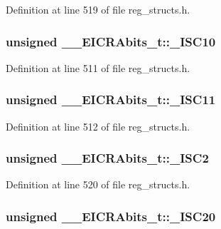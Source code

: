 Definition at line 519 of file reg\+\_\+structs.\+h.

\hypertarget{union_____e_i_c_r_abits__t_a7ede693280bdf47a326b0d9ea6622afd}{
\subsubsection[{\+\_\+\+I\+S\+C10}]{\setlength{\rightskip}{0pt plus 5cm}unsigned \+\_\+\+\_\+\+E\+I\+C\+R\+Abits\+\_\+t\+::\+\_\+\+I\+S\+C10}}\label{union_____e_i_c_r_abits__t_a7ede693280bdf47a326b0d9ea6622afd}


Definition at line 511 of file reg\+\_\+structs.\+h.

\hypertarget{union_____e_i_c_r_abits__t_af7d0c50aae9973b66dd6f50ac5c48ba2}{
\subsubsection[{\+\_\+\+I\+S\+C11}]{\setlength{\rightskip}{0pt plus 5cm}unsigned \+\_\+\+\_\+\+E\+I\+C\+R\+Abits\+\_\+t\+::\+\_\+\+I\+S\+C11}}\label{union_____e_i_c_r_abits__t_af7d0c50aae9973b66dd6f50ac5c48ba2}


Definition at line 512 of file reg\+\_\+structs.\+h.

\hypertarget{union_____e_i_c_r_abits__t_aa29a31a881d4a3003f875ee647d60839}{
\subsubsection[{\+\_\+\+I\+S\+C2}]{\setlength{\rightskip}{0pt plus 5cm}unsigned \+\_\+\+\_\+\+E\+I\+C\+R\+Abits\+\_\+t\+::\+\_\+\+I\+S\+C2}}\label{union_____e_i_c_r_abits__t_aa29a31a881d4a3003f875ee647d60839}


Definition at line 520 of file reg\+\_\+structs.\+h.

\hypertarget{union_____e_i_c_r_abits__t_aa68988705ad052dd276ca507a777753c}{
\subsubsection[{\+\_\+\+I\+S\+C20}]{\setlength{\rightskip}{0pt plus 5cm}unsigned \+\_\+\+\_\+\+E\+I\+C\+R\+Abits\+\_\+t\+::\+\_\+\+I\+S\+C20}}\label{union_____e_i_c_r_abits__t_aa68988705ad052dd276ca507a777753c}


